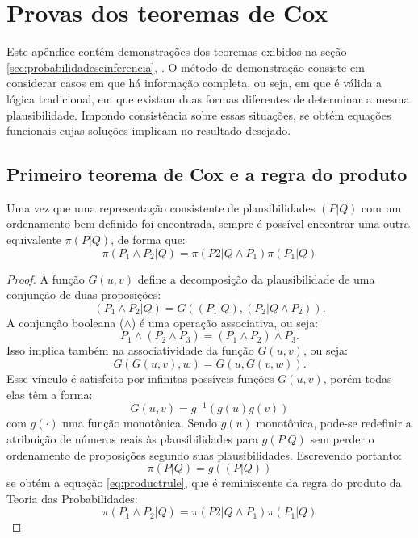 \chapter{Provas dos teoremas de Cox}
\label{ap:provateoremas}

Este apêndice contém demonstrações dos teoremas exibidos na seção \ref{sec:probabilidadeseinferencia}, \emph{}. O método de demonstração consiste em considerar casos em que há informação completa, ou seja, em que é válida a lógica tradicional, em que existam duas formas diferentes de determinar a mesma plausibilidade. Impondo consistência sobre essas situações, se obtém equações funcionais cujas soluções implicam no resultado desejado. 

\section{Primeiro teorema de Cox e a regra do produto} 
\begin{Teorema}
    Uma vez que uma representação consistente de plausibilidades $(P|Q)$ com um ordenamento bem definido foi encontrada, sempre é possível encontrar uma outra equivalente $\pi(P|Q)$, de forma que:
    \begin{equation}
	\label{eq:productrule}
	\pi(P_1\wedge P_2|Q) = \pi(P2 | Q \wedge P_1) \pi(P_1| Q)
    \end{equation}
\begin{proof}
A função $G(u,v)$ define a decomposição da plausibilidade de uma conjunção de duas proposições:
\[
 (P_1\wedge P_2|Q) = G((P_1|Q), (P_2|Q\wedge P_2)).
\]
A conjunção booleana ($\wedge$) é uma operação associativa, ou seja:
\[
  P_1\wedge (P_2 \wedge P_3) =  (P_1\wedge P_2) \wedge P_3.
\] 
Isso implica também na associatividade da função $G(u,v)$, ou seja:
\[
  G(G(u,v),w) = G(u,G(v,w)). 
\]
Esse vínculo é satisfeito por infinitas possíveis funções $G(u,v)$, porém todas elas \cite{Aczel1975, ACaticha2008} têm a forma:
\[
  G(u,v)  = g^{-1}(g(u) g(v)) 
\]
com $g(\cdot)$ uma função monotônica. Sendo $g(u)$ monotônica, pode-se redefinir a atribuição de números reais às plausibilidades para $g(P|Q)$ sem perder o ordenamento de proposições segundo suas plausibilidades. Escrevendo portanto:
\[
 \pi(P|Q) = g((P|Q))
\]
se obtém a equação \eqref{eq:productrule}, que é reminiscente da regra do produto da Teoria das Probabilidades:
\[
  \pi(P_1\wedge P_2|Q) = \pi(P2 | Q \wedge P_1) \pi(P_1| Q)
\]
\end{proof}
\end{Teorema}

